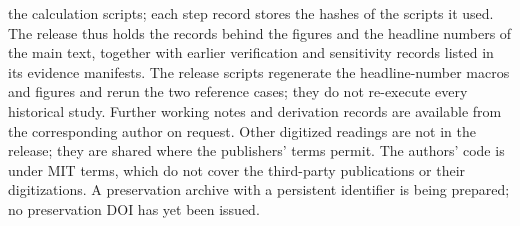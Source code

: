 \documentclass[11pt]{article}
\begin{document}
the calculation scripts; each step record stores the hashes of the
scripts it used. The release thus holds the records behind the figures and
the headline numbers of the main text, together with earlier verification
and sensitivity records listed in its evidence manifests. The release
scripts regenerate the headline-number macros and figures and rerun the
two reference cases; they do not re-execute every historical study.
Further working notes and derivation records are available from the
corresponding author on request.
Other digitized readings are not in the release; they are shared where the
publishers' terms permit. The authors' code
is under MIT terms, which do not cover the third-party publications or
their digitizations. A preservation archive with a persistent identifier
is being prepared; no preservation DOI has yet been issued.

\clearpage
\end{document}
